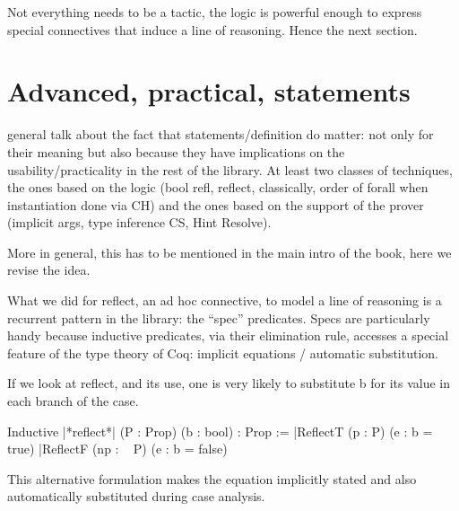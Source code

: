 





Not everything needs to be a tactic, the logic is powerful
enough to express special connectives that induce a line of
reasoning. Hence the next section.

\section{Advanced, practical, statements}

general talk about the fact that statements/definition do matter: not only for
their meaning but also because they have implications on the
usability/practicality in the rest of the library.  At least two classes of
techniques, the ones based on the logic (bool refl, reflect, classically, order
of forall when instantiation done via CH) and the ones based on the support of
the prover (implicit args, type inference CS, Hint Resolve).

More in general, this has to be mentioned in the main intro of the book, here
we revise the idea.

What we did for reflect, an ad hoc connective, to model a line of reasoning is
a recurrent pattern in the \mcbMC{} library: the ``spec'' predicates.  Specs
are particularly handy  because inductive predicates, via their elimination
rule, accesses a special feature of the type theory of Coq: implicit equations
/ automatic substitution.

If we look at reflect, and its use, one is very likely to substitute b
for its value in each branch of the case.

\begin{coq}{}{}
Inductive |*reflect*| (P : Prop) (b : bool) : Prop :=
|ReflectT (p : P)    (e : b = true)
|ReflectF (np : ~ P) (e : b = false)
\end{coq}

This alternative formulation makes the equation implicitly stated and
also automatically substituted during case analysis.


